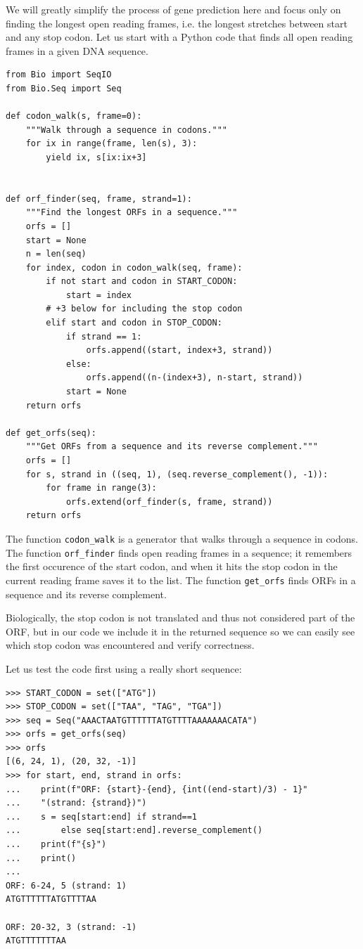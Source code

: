 We will greatly simplify the process of gene prediction here and focus only on finding the longest open reading frames, i.e. the longest stretches between start and any stop codon. Let us start with a Python code that finds all open reading frames in a given DNA sequence.

\vspace*{3mm}
\begin{lstlisting}
from Bio import SeqIO
from Bio.Seq import Seq

def codon_walk(s, frame=0):
    """Walk through a sequence in codons."""
    for ix in range(frame, len(s), 3):
        yield ix, s[ix:ix+3]


def orf_finder(seq, frame, strand=1):
    """Find the longest ORFs in a sequence."""
    orfs = []
    start = None
    n = len(seq)
    for index, codon in codon_walk(seq, frame):
        if not start and codon in START_CODON:
            start = index
        # +3 below for including the stop codon
        elif start and codon in STOP_CODON:
            if strand == 1:
                orfs.append((start, index+3, strand))
            else:
                orfs.append((n-(index+3), n-start, strand))
            start = None
    return orfs

def get_orfs(seq):
    """Get ORFs from a sequence and its reverse complement."""
    orfs = []
    for s, strand in ((seq, 1), (seq.reverse_complement(), -1)):
        for frame in range(3):
            orfs.extend(orf_finder(s, frame, strand))
    return orfs
\end{lstlisting}

The function \texttt{codon\_walk} is a generator that walks through a sequence in codons. The function \texttt{orf\_finder} finds open reading frames in a sequence; it remembers the first occurence of the start codon, and when it hits the stop codon in the current reading frame saves it to the list. The function \texttt{get\_orfs} finds ORFs in a sequence and its reverse complement.

Biologically, the stop codon is not translated and thus not considered part of the ORF, but in our code we include it in the returned sequence so we can easily see which stop codon was encountered and verify correctness.

Let us test the code first using a really short sequence:

\vspace*{3mm}
\begin{lstlisting}
>>> START_CODON = set(["ATG"])
>>> STOP_CODON = set(["TAA", "TAG", "TGA"])
>>> seq = Seq("AAACTAATGTTTTTTATGTTTTAAAAAAACATA")
>>> orfs = get_orfs(seq)
>>> orfs
[(6, 24, 1), (20, 32, -1)]
>>> for start, end, strand in orfs:
...    print(f"ORF: {start}-{end}, {int((end-start)/3) - 1}"
...    "(strand: {strand})")
...    s = seq[start:end] if strand==1 
...        else seq[start:end].reverse_complement()
...    print(f"{s}")
...    print()
...
ORF: 6-24, 5 (strand: 1)
ATGTTTTTTATGTTTTAA

ORF: 20-32, 3 (strand: -1)
ATGTTTTTTTAA
\end{lstlisting}

